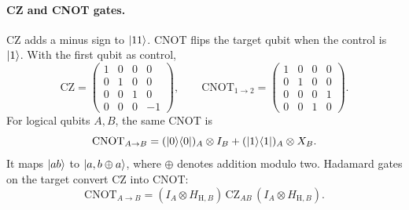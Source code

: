 \paragraph{CZ and CNOT gates.}
CZ adds a minus sign to $\lvert 11\rangle$. CNOT flips the target qubit
when the control is $\lvert 1\rangle$. With the first qubit as control,
\begin{equation}
 \mathrm{CZ}=\begin{pmatrix}
  1&0&0&0\\0&1&0&0\\0&0&1&0\\0&0&0&-1
 \end{pmatrix},\qquad
 \mathrm{CNOT}_{1\to2}=\begin{pmatrix}
  1&0&0&0\\0&1&0&0\\0&0&0&1\\0&0&1&0
 \end{pmatrix}.
 \label{eq:controlled-logical-gate-matrices}
\end{equation}
For logical qubits $A,B$, the same CNOT is
\begin{equation}
 \mathrm{CNOT}_{A\to B}
   =(\ket0\bra0)_A\otimes I_B
    +(\ket1\bra1)_A\otimes X_B.
 \label{eq:exchange-only-cnot-definition}
\end{equation}
It maps $\lvert ab\rangle$ to $\lvert a,b\mathbin\oplus a\rangle$, where
$\oplus$ denotes addition modulo two. Hadamard gates on the target
convert CZ into CNOT:
\begin{equation}
 \mathrm{CNOT}_{A\to B}
   =(I_A\otimes H_{\mathrm H,B})\,\mathrm{CZ}_{AB}\,
     (I_A\otimes H_{\mathrm H,B}).
 \label{eq:exchange-cnot-construction}
\end{equation}

\endgroup

